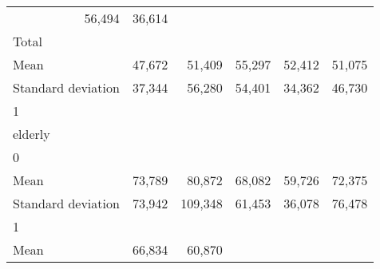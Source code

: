 \begin{tabular}{llllll}
  \multicolumn{1}{r}{56,494} &
  \multicolumn{1}{r}{36,614} \\
\multicolumn{1}{l}{\hspace{3em}Total} &
  \multicolumn{1}{|r}{} &
  \multicolumn{1}{r}{} &
  \multicolumn{1}{r}{} &
  \multicolumn{1}{r}{} &
  \multicolumn{1}{r}{} \\
\multicolumn{1}{l}{\hspace{4em}Mean} &
  \multicolumn{1}{|r}{47,672} &
  \multicolumn{1}{r}{51,409} &
  \multicolumn{1}{r}{55,297} &
  \multicolumn{1}{r}{52,412} &
  \multicolumn{1}{r}{51,075} \\
\multicolumn{1}{l}{\hspace{4em}Standard deviation} &
  \multicolumn{1}{|r}{37,344} &
  \multicolumn{1}{r}{56,280} &
  \multicolumn{1}{r}{54,401} &
  \multicolumn{1}{r}{34,362} &
  \multicolumn{1}{r}{46,730} \\
\multicolumn{1}{l}{\hspace{1em}1} &
  \multicolumn{1}{|r}{} &
  \multicolumn{1}{r}{} &
  \multicolumn{1}{r}{} &
  \multicolumn{1}{r}{} &
  \multicolumn{1}{r}{} \\
\multicolumn{1}{l}{\hspace{2em}elderly} &
  \multicolumn{1}{|r}{} &
  \multicolumn{1}{r}{} &
  \multicolumn{1}{r}{} &
  \multicolumn{1}{r}{} &
  \multicolumn{1}{r}{} \\
\multicolumn{1}{l}{\hspace{3em}0} &
  \multicolumn{1}{|r}{} &
  \multicolumn{1}{r}{} &
  \multicolumn{1}{r}{} &
  \multicolumn{1}{r}{} &
  \multicolumn{1}{r}{} \\
\multicolumn{1}{l}{\hspace{4em}Mean} &
  \multicolumn{1}{|r}{73,789} &
  \multicolumn{1}{r}{80,872} &
  \multicolumn{1}{r}{68,082} &
  \multicolumn{1}{r}{59,726} &
  \multicolumn{1}{r}{72,375} \\
\multicolumn{1}{l}{\hspace{4em}Standard deviation} &
  \multicolumn{1}{|r}{73,942} &
  \multicolumn{1}{r}{109,348} &
  \multicolumn{1}{r}{61,453} &
  \multicolumn{1}{r}{36,078} &
  \multicolumn{1}{r}{76,478} \\
\multicolumn{1}{l}{\hspace{3em}1} &
  \multicolumn{1}{|r}{} &
  \multicolumn{1}{r}{} &
  \multicolumn{1}{r}{} &
  \multicolumn{1}{r}{} &
  \multicolumn{1}{r}{} \\
\multicolumn{1}{l}{\hspace{4em}Mean} &
  \multicolumn{1}{|r}{66,834} &
  \multicolumn{1}{r}{60,870} &

\end{tabular}
